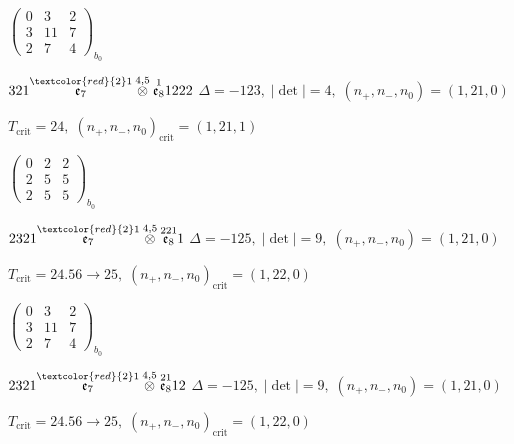 \documentclass[10pt]{article}
\begin{document}
\hspace{2em}$\left(\begin{smallmatrix}0 & 3 & 2 \\ 3 & 11 & 7 \\ 2 & 7 & 4\end{smallmatrix}\right)_{\!b_0}$

\smallskip

$321\overset{\textcolor{red}{2}1}{\mathfrak{e}_7}\overset{4,5}{\otimes}\overset{1}{\mathfrak{e}_8}1222$ \quad $\Delta=-123,\; |\det|=4,\; (n_+,n_-,n_0)=(1,21,0)$

\hspace{1em}$T_{\text{crit}}=24,\; (n_+,n_-,n_0)_{\text{crit}}=(1,21,1)$

\hspace{2em}$\left(\begin{smallmatrix}0 & 2 & 2 \\ 2 & 5 & 5 \\ 2 & 5 & 5\end{smallmatrix}\right)_{\!b_0}$

\smallskip

$2321\overset{\textcolor{red}{2}1}{\mathfrak{e}_7}\overset{4,5}{\otimes}\overset{221}{\mathfrak{e}_8}1$ \quad $\Delta=-125,\; |\det|=9,\; (n_+,n_-,n_0)=(1,21,0)$

\hspace{1em}$T_{\text{crit}}=24.56 \to 25,\; (n_+,n_-,n_0)_{\text{crit}}=(1,22,0)$

\hspace{2em}$\left(\begin{smallmatrix}0 & 3 & 2 \\ 3 & 11 & 7 \\ 2 & 7 & 4\end{smallmatrix}\right)_{\!b_0}$

\smallskip

$2321\overset{\textcolor{red}{2}1}{\mathfrak{e}_7}\overset{4,5}{\otimes}\overset{21}{\mathfrak{e}_8}12$ \quad $\Delta=-125,\; |\det|=9,\; (n_+,n_-,n_0)=(1,21,0)$

\hspace{1em}$T_{\text{crit}}=24.56 \to 25,\; (n_+,n_-,n_0)_{\text{crit}}=(1,22,0)$
\end{document}
